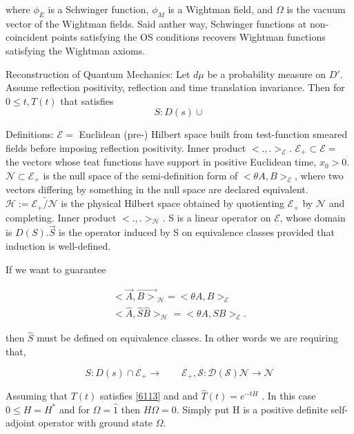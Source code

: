\documentclass{article}
\newcommand{\1}{\mathbbm{1}}
\theoremstyle{plain}
\theoremstyle{definition}
\numberwithin{equation}{section}
\begin{document}
where $\phi_E$ is a Schwinger function, $\phi_M$ is a Wightman field, and $\Omega$ is the vacuum vector of the Wightman fields. Said anther way, Schwinger functions at non-coincident points satisfying the OS conditions recovers Wightman functions satisfying the Wightman axioms.

 

Reconstruction of Quantum Mechanics: Let $d \mu$ be a probability measure on $D'$. Assume reflection positivity, reflection and time translation invariance. Then for $0 \leq t , T(t) $ that satisfies 
\begin{equation}
S: D(s) \cup 
\end{equation}

Definitions: $\mathcal{E}=$ Euclidean (pre-) Hilbert space built from test-function smeared fields before imposing reflection positivity. Inner product $< .,.>_{\mathcal{E}}$. $\mathcal{E}_+ \subset \mathcal{E}=$ the vectors whose teat functions have support in positive Euclidean time, $x_0 > 0$. $\mathcal{N} \subset \mathcal{E}_+$ is the null space of the semi-definition form of $< \theta A, B> _{\mathcal{E}}$, where two vectors differing by something in the null space are declared equivalent. $\mathcal{H} := \bar{ \mathcal{E}_{+}/\mathcal{N}}$ is the physical Hilbert space obtained by quotienting $\mathcal{E}_+$ by $\mathcal{N}$ and completing. Inner product $< . , . >_{\mathcal{H}}$. S is a linear operator on $\mathcal{E}$, whose domain is $D(S)$.$\vec{S}$ is the operator induced by S on equivalence classes provided that induction is well-defined. 

If we want to guarantee 

\begin{equation}
    \begin{split}
        < \vec{A}, \vec{B >}_{\mathcal{H}}= < \theta A, B>_{\mathcal{E}}
        \\
        < \hat{A}, \hat{S} \hat{B}>_{\mathcal{H}}= < \theta A, SB>_{\mathcal{E}}.
    \end{split}
\end{equation}


then $\hat{S}$ must be defined on equivalence classes. In other words we are requiring that, 

\begin{equation}\label{6113}
    S: D(s) \cap  \mathcal{E}_+ \rightarrow \qquad \mathcal{E_{+}, S: D(S) } \mathcal{N} \rightarrow \mathcal{N}
\end{equation}

Assuming that $T(t)$ satisfies \eqref{6113} and and $\hat{T}(t) = e^{-t H}$ . In this case $0 \leq H = H^*$ and for $\Omega= \hat{1}$ then $H \Omega = 0 $. Simply put H is a positive definite self-adjoint operator with ground state $\Omega$. 
\end{document}
